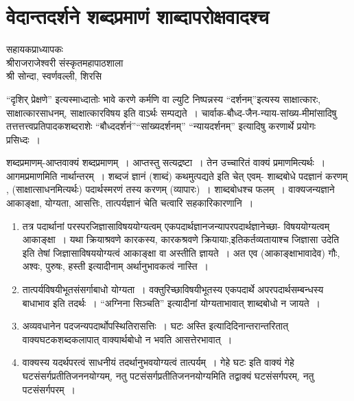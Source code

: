 {\fontsize{15}{17}\selectfont
\presetvalues
\chapter{वेदान्तदर्शने शब्दप्रमाणं शाब्दापरोक्षवादश्च}

\begin{center}
\smallskip
 सहायकप्राध्यापकः\\
श्रीराजराजेश्वरी संस्कृतमहापाठशाला\\
श्री सोन्दा, स्वर्णवल्ली, शिरसि
\addrule
\end{center}

“दृशिर् प्रेक्षणे” इत्यस्माध्दातोः भावे करणे कर्मणि वा ल्युटि निष्पन्नस्य “दर्शनम्”\break इत्यस्य साक्षात्कारः, साक्षात्कारसाधनम्, साक्षात्कारविषय इति वाऽर्थः सम्पद्यते~। चार्वाक-बौध्द-जैन-न्याय-सांख्य-मीमांसादिषु तत्तत्तत्त्वप्रतिपादकशब्दराशेः “बौध्ददर्शनं”\break “सांख्यदर्शनम्” “न्यायदर्शनम्”  इत्यादिषु करणार्थे प्रयोगः प्रसिध्दः~। 

शब्दप्रमाणम्-आप्तवाक्यं शब्दप्रमाणम्~। आप्तस्तु सत्यद्रष्टा~। तेन उच्चारितं वाक्यं प्रमाणमित्यर्थः~। आगमप्रमाणमिति नार्थान्तरम्~। शब्दजं ज्ञानं (शाब्दं) कथमुत्पद्यते इति चेत् एवम्- शाब्दबोधे पदज्ञानं करणम् , (साक्षात्साधनमित्यर्थः) पदार्थस्मरणं तस्य करणम् (व्यापारः)~।  शाब्दबोधश्च फलम्~। वाक्यजन्यज्ञाने आकाङ्क्षा, योग्यता, आसत्तिः, तात्पर्यज्ञानं चेति चत्वारि सहकारिकारणानि~। 

\begin{enumerate}
\itemsep=0pt
\item तत्र पदार्थानां परस्परजिज्ञासाविषययोग्यत्वम् एकपदार्थज्ञानजन्यापरपदार्थज्ञानेच्छा- विषययोग्यत्वम् आकाङ्क्षा~। यथा क्रियाश्रवणे कारकस्य, कारकश्रवणे क्रियायाः,\break इतिकर्तव्यतायाश्च जिज्ञासा उदेति इति तेषां जिज्ञासाविषययोग्यत्वं आकाङ्क्षा वा अस्तीति ज्ञायते~। अत एव (आकाङ्क्षाभावादेव) गौः, अश्वः, पुरुषः, हस्ती इत्यादी\-नाम् अर्थानुभावकत्वं नास्ति~। 
\item तात्पर्यविषयीभूतसंसर्गाबाधो योग्यता~। वक्तुरिच्छाविषयीभूतस्य एकपदार्थे अपर\-पदार्थसम्बन्धस्य बाधाभाव इति तदर्थः~। “अग्निना सिञ्चति” इत्यादीनां योग्यताभावात् शाब्दबोधो न जायते~। 
\item अव्यवधानेन पदजन्यपदार्थोपस्थितिरासत्तिः~। घटः अस्ति इत्यादिदिनान्तरान्तरितात् वाक्यघटकशब्दकलापात् वाक्यार्थबोधो न भवति आसत्तेरभावात्~। 
\item वाक्यस्य यदर्थपरत्वं साधनीयं तदर्थानुभवयोग्यत्वं  तात्पर्यम्~। गेहे घटः इति वाक्यं गेहे घटसंसर्गप्रतीतिजननयोग्यम्, नतु पटसंसर्गप्रतीतिजननयोग्यमिति तद्वाक्यं घटसंसर्गपरम्, नतु पटसंसर्गपरम्~। 
\end{enumerate}

}
